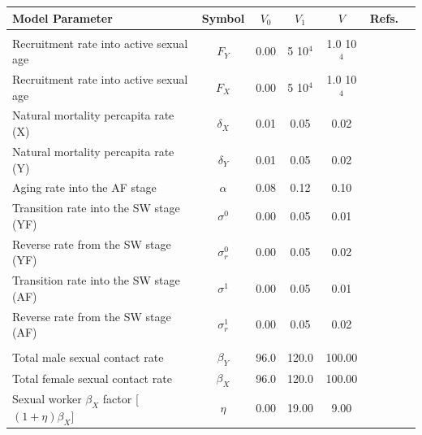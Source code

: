 \documentclass[preprint,12pt]{elsarticle}
\begin{document}
\hspace{-1.0cm}\begin{table}
\centering
\begin{tabular}{p{7.0cm}cccccc}
{\bf Model Parameter}                                  & {\bf Symbol}   & {\bf $V_0$} & {\bf $V_1$} & {\bf $V$} & {\bf Refs.}\\
\hline\hline
\rowcolor{blue!15}              %
\multicolumn{6}{c}{Demographic parameters}\\
\hline
{\small Recruitment rate into active sexual age}        & $F_Y$         & 0.00 & 5 10$^4$ & 1.0 10$^4$ & \cite{webSexRatio}\\
{\small Recruitment rate into active sexual age}        & $F_X$         & 0.00 & 5 10$^4$ & 1.0 10$^4$ &\cite{webSexRatio}\\
{\small Natural mortality percapita rate (X)}           & $\delta_X$    & 0.01 & 0.05     & 0.02 
&\cite{webSexRatio}\\
{\small Natural mortality percapita rate (Y)}           & $\delta_Y$    & 0.01 & 0.05     & 0.02 
&\cite{webSexRatio}\\
{\small Aging rate into the AF stage}                   & $\alpha$      & 0.08 & 0.12     & 0.10 &\\  
{\small Transition rate into the SW stage (YF)}         & $\sigma^0$    & 0.00 & 0.05     & 0.01 &\\
{\small Reverse rate from the SW stage (YF)}            & $\sigma^0_r$  & 0.00 & 0.05     & 0.02 &\\
{\small Transition rate into the SW stage (AF)}         & $\sigma^1$    & 0.00 & 0.05     & 0.01 &\\
{\small Reverse rate from the SW stage (AF)}            & $\sigma^1_r$  & 0.00 & 0.05     & 0.02 &\\
\hline
\rowcolor{pink}              %
\hline
\multicolumn{6}{c}{Disease transmission parameters}\\
\hline
{\small Total male sexual contact rate}                    & $\beta_Y$   & 96.0 & 120.0   & 100.00 & \cite{Wawer2005}\\
{\small Total female sexual contact rate}                  & $\beta_X$   & 96.0 & 120.0   & 100.00 & \cite{Wawer2005}\\
{\small Sexual worker $\beta_X$ factor [$(1+\eta)\beta_X$}] & $\eta$      & 0.00 & 19.00  & 9.00 &\\

\end{tabular}
\end{table}
\end{document}
